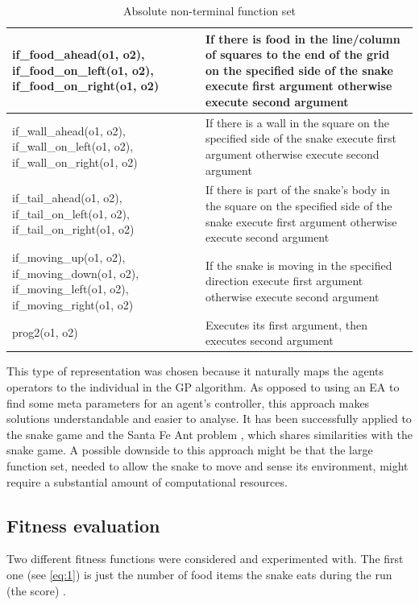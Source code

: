 \documentclass[12pt,a4paper]{article}
\begin{document}
	\begin{table}[h!]
		\centering
		\begin{tabu} to \textwidth {|X[3,l]|X[5,l]|}
			\hline
			if\_food\_ahead(o1, o2), if\_food\_on\_left(o1, o2), if\_food\_on\_right(o1, o2) & If there is food in the line/column of squares to the end of the grid on the specified side of the snake execute first argument otherwise execute second argument\\  
			\hline
			
			if\_wall\_ahead(o1, o2), if\_wall\_on\_left(o1, o2), if\_wall\_on\_right(o1, o2) & If there is a wall in the square on the specified side of the snake execute first argument otherwise execute second argument\\  
			\hline
			
			if\_tail\_ahead(o1, o2), if\_tail\_on\_left(o1, o2), if\_tail\_on\_right(o1, o2) & If there is part of the snake's body in the square on the specified side of the snake execute first argument otherwise execute second argument\\  
			\hline
			
			if\_moving\_up(o1, o2), if\_moving\_down(o1, o2), if\_moving\_left(o1, o2), if\_moving\_right(o1, o2) & If the snake is moving in the specified direction execute first argument otherwise execute second argument\\  
			\hline
			
			prog2(o1, o2) & Executes its first argument, then executes second argument \\   
			\hline
		\end{tabu}
		
		\caption{Absolute non-terminal function set}
		\label{table:absolute-non-terminals}
	\end{table}
	
	This type of representation was chosen because it naturally maps the agents operators to the individual in the GP algorithm. As opposed to using an EA to find some meta parameters for an agent's controller, this approach makes solutions understandable and easier to analyse. It has been successfully applied to the snake game \cite{ehlis_application_2000} and the Santa Fe Ant problem \cite{koza_genetic_1992}, which shares similarities with the snake game. A possible downside to this approach might be that the
	large function set, needed to allow the snake to move and sense its environment, might require a substantial amount of computational resources.
	
	
	\subsection{Fitness evaluation}
	Two different fitness functions were considered and experimented with. The first one (see \autoref{eq:1}) is just the number of food items the snake eats during the run (the score) . 
	
\end{document}
